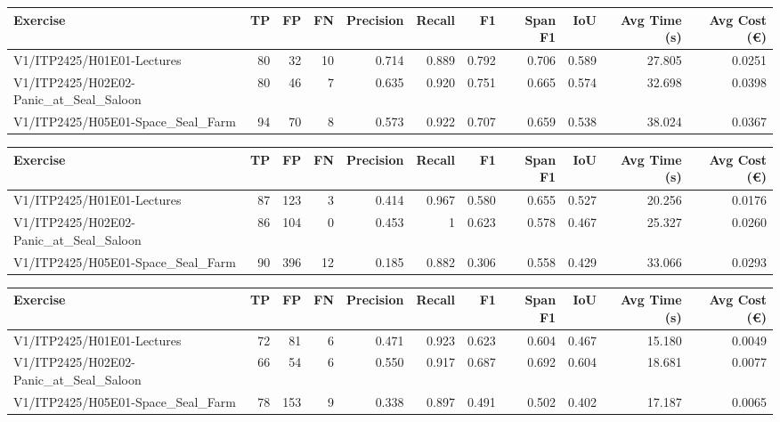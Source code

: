 \begin{tabular}{lrrrrrrrrrr}
Exercise & TP & FP & FN & Precision & Recall & F1 & Span F1 & IoU & Avg Time (s) & Avg Cost (€) \\
\hline
V1/ITP2425/H01E01-Lectures & 80 & 32 & 10 & 0.714 & 0.889 & 0.792 & 0.706 & 0.589 & 27.805 & 0.0251 \\
V1/ITP2425/H02E02-Panic\_at\_Seal\_Saloon & 80 & 46 & 7 & 0.635 & 0.920 & 0.751 & 0.665 & 0.574 & 32.698 & 0.0398 \\
V1/ITP2425/H05E01-Space\_Seal\_Farm & 94 & 70 & 8 & 0.573 & 0.922 & 0.707 & 0.659 & 0.538 & 38.024 & 0.0367 \\
\end{tabular}

\begin{tabular}{lrrrrrrrrrr}
Exercise & TP & FP & FN & Precision & Recall & F1 & Span F1 & IoU & Avg Time (s) & Avg Cost (€) \\
\hline
V1/ITP2425/H01E01-Lectures & 87 & 123 & 3 & 0.414 & 0.967 & 0.580 & 0.655 & 0.527 & 20.256 & 0.0176 \\
V1/ITP2425/H02E02-Panic\_at\_Seal\_Saloon & 86 & 104 & 0 & 0.453 & 1 & 0.623 & 0.578 & 0.467 & 25.327 & 0.0260 \\
V1/ITP2425/H05E01-Space\_Seal\_Farm & 90 & 396 & 12 & 0.185 & 0.882 & 0.306 & 0.558 & 0.429 & 33.066 & 0.0293 \\
\end{tabular}

\begin{tabular}{lrrrrrrrrrr}
Exercise & TP & FP & FN & Precision & Recall & F1 & Span F1 & IoU & Avg Time (s) & Avg Cost (€) \\
\hline
V1/ITP2425/H01E01-Lectures & 72 & 81 & 6 & 0.471 & 0.923 & 0.623 & 0.604 & 0.467 & 15.180 & 0.0049 \\
V1/ITP2425/H02E02-Panic\_at\_Seal\_Saloon & 66 & 54 & 6 & 0.550 & 0.917 & 0.687 & 0.692 & 0.604 & 18.681 & 0.0077 \\
V1/ITP2425/H05E01-Space\_Seal\_Farm & 78 & 153 & 9 & 0.338 & 0.897 & 0.491 & 0.502 & 0.402 & 17.187 & 0.0065 \\
\end{tabular}

